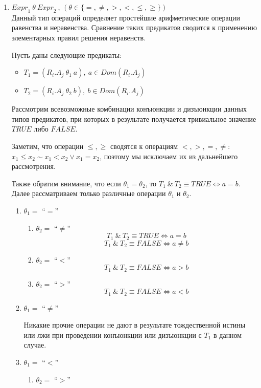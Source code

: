 \documentclass{cmi}
\def \n #1{\mathit{#1}}
\begin{document}
\begin{enumerate}
	\item $ \n{Expr}_1\ \theta\ \n{Expr}_2\ $, $(\theta \in \{=, \neq, >, <, \leq, \geq\})$\\
	Данный тип операций определяет простейшие арифметические операции равенства и неравенства. Сравнение
	таких предикатов сводится к применению элементарных правил решения неравенств.
	
	Пусть даны следующие предикаты:
	\begin{itemize}
		\item $T_1 = (R_i.A_j\ \theta_1\ a),\ a \in Dom(R_i.A_j)$
		\item $T_2 = (R_i.A_j\ \theta_2\ b),\ b \in Dom(R_i.A_j)$
	\end{itemize}
	
	Рассмотрим всевозможные комбинации конъюнкции и дизъюнкции данных типов предикатов, при которых в
	результате получается тривиальное значение $\n{TRUE}$ либо $\n{FALSE}$.
	
	Заметим, что операции $\leq,
	\geq$ сводятся к операциям $<, >, =, \neq$: $x_1 \leq x_2 \sim x_1 < x_2 \vee x_1 = x_2$, поэтому мы исключаем их из дальнейшего рассмотрения.
	
	Также обратим внимание, что если $\theta_1 = \theta_2$, то $T_1\ \&\ T_2 \equiv \n{TRUE} \iff a = b$.
	Далее рассматриваем только различные операции $\theta_1$ и $\theta_2$.
	
	\begin{enumerate}
		\item $\theta_1 = $ ``$=$''
		\begin{enumerate}
			\item $\theta_2 = $ ``$\neq$''  	
			$$T_1\ \&\ T_2 \equiv \n{TRUE} \iff a = b$$
			$$T_1\ \&\ T_2 \equiv \n{FALSE} \iff a \neq b$$
			
			\item $\theta_2 = $ ``$<$''
			$$T_1\ \&\ T_2 \equiv \n{FALSE} \iff a > b$$
			
			\item $\theta_2 = $ ``$>$''
			$$T_1\ \&\ T_2 \equiv \n{FALSE} \iff a < b$$
		\end{enumerate}
		
		\item $\theta_1 = $ ``$\neq$''
		
		Никакие прочие операции не дают в результате тождественной истины или лжи при проведении конъюнкции или дизъюнкции с $T_1$ в данном случае.
		
		\item $\theta_1 = $ ``$<$''
		\begin{enumerate}
			\item $\theta_2 = $ ``$>$''
			

\end{enumerate}
\end{enumerate}
\end{enumerate}
\end{document}
